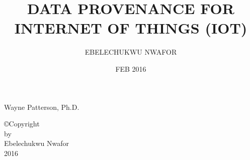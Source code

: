 \documentclass[12pt]{report}
\begin{document}

\setcounter{tocdepth}{2}


\title{DATA PROVENANCE FOR INTERNET OF THINGS (IOT)}

\author{EBELECHUKWU NWAFOR}
\date{FEB 2016}

                 {Wayne Patterson, Ph.D.}
               
                 
				


\makesigpage

\begin{CenteredPage}
\copyright Copyright\\[0.2in]
by\\[0.2in]
Ebelechukwu Nwafor\\[0.2in]
2016
\end{CenteredPage}

\maketitlepage
\end{document}

